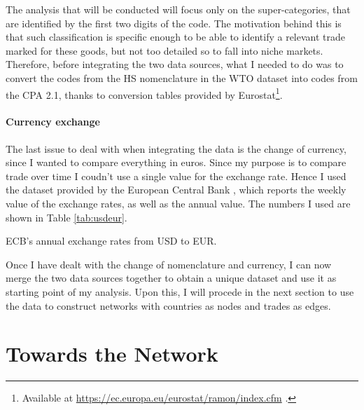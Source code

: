 The analysis that will be conducted will focus only on the super-categories, that are identified by the first two digits of the code. The motivation behind this is that such classification is specific enough to be able to identify a relevant trade marked for these goods, but not too detailed so to fall into niche markets.
Therefore, before integrating the two data sources, what I needed to do was to convert the codes from the HS nomenclature in the WTO dataset into codes from the CPA 2.1, thanks to conversion tables provided by Eurostat\footnote{Available at \url{https://ec.europa.eu/eurostat/ramon/index.cfm} .}.


\paragraph{Currency exchange}\label{sec:usdeur}
The last issue to deal with when integrating the data is the change of currency, since I wanted to compare everything in euros. Since my purpose is to compare trade over time I coudn't use a single value for the exchange rate. Hence I used the dataset provided by the European Central Bank \cite{ecb2021usdeur}, which reports the weekly value of the exchange rates, as well as the annual value. The numbers I used are shown in Table \ref{tab:usdeur}.

\begin{table}
    \centering
    
    \caption{ECB's annual exchange rates from USD to EUR.}
    \label{tab:usdeur}
\end{table}

Once I have dealt with the change of nomenclature and currency, I can now merge the two data sources together to obtain a unique dataset and use it as starting point of my analysis. Upon this, I will procede in the next section to use the data to construct networks with countries as nodes and trades as edges.

\section{Towards the Network}

